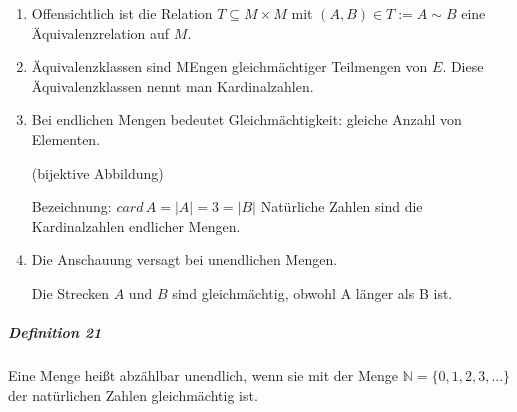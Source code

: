 \documentclass[a4paper]{scrartcl}
\begin{document}
\begin{enumerate}
\item Offensichtlich ist die Relation $T \subseteq M \times M$ mit $(A,B) \in T := A \sim B$ eine Äquivalenzrelation auf $M$.

\item Äquivalenzklassen sind MEngen gleichmächtiger Teilmengen von $E$. Diese Äquivalenzklassen nennt man Kardinalzahlen.
\item Bei endlichen Mengen bedeutet Gleichmächtigkeit: gleiche Anzahl von Elementen.

 (bijektive Abbildung)

Bezeichnung: $card\,A = \lvert A \rvert = 3 = \lvert B \rvert$
Natürliche Zahlen sind die Kardinalzahlen endlicher Mengen.

\item Die Anschauung versagt bei unendlichen Mengen.



Die Strecken $A$ und $B$ sind gleichmächtig, obwohl A länger als B ist.

\end{enumerate}


\subparagraph{Definition 21} Eine Menge heißt abzählbar unendlich, wenn sie mit der Menge $\mathbb{N} = \{0,1,2,3,...\}$ der natürlichen Zahlen gleichmächtig ist.
\end{document}
